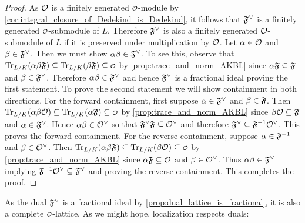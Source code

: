 \begin{proof}
      As $\mathcal{O}$ is a finitely generated $\smc{O}$-module by \cref{cor:integral_closure_of_Dedekind_is_Dedekind}, it follows that $\mathfrak{F}^{\vee}$ is a finitely generated $\smc{O}$-submodule of $L$. Therefore $\mathfrak{F}^{\vee}$ is also a finitely generated $\mathcal{O}$-submodule of $L$ if it is preserved under multiplication by $\mathcal{O}$. Let $\alpha \in \mathcal{O}$ and $\beta \in \mathfrak{F}^{\vee}$. Then we must show $\alpha\beta \in \mathfrak{F}^{\vee}$. To see this, observe that $\Trace_{L/K}(\a\b\mf{F}) \subseteq \Trace_{L/K}(\b\mf{F}) \subseteq \smc{O}$ by \cref{prop:trace_and_norm_AKBL} since $\alpha\mathfrak{F} \subseteq \mathfrak{F}$ and $\beta \in \mathfrak{F}^{\vee}$. Therefore $\alpha\beta \in \mathfrak{F}^{\vee}$ and hence $\mathfrak{F}^{\vee}$ is a fractional ideal proving the first statement. To prove the second statement we will show containment in both directions. For the forward containment, first suppose $\alpha \in \mathfrak{F}^{\vee}$ and $\beta \in \mathfrak{F}$. Then $\Trace_{L/K}(\a\b\mc{O}) \subseteq \Trace_{L/K}(\a\mf{F}) \subseteq \smc{O}$ by \cref{prop:trace_and_norm_AKBL} since $\beta\mathcal{O} \subseteq \mathfrak{F}$ and $\alpha \in \mathfrak{F}^{\vee}$. Hence $\alpha\beta \in \mathcal{O}^{\vee}$ so that $\mathfrak{F}^{\vee}\mathfrak{F} \subseteq \mathcal{O}^{\vee}$ and therefore $\mathfrak{F}^{\vee} \subseteq \mathfrak{F}^{-1}\mathcal{O}^{\vee}$. This proves the forward containment. For the reverse containment, suppose $\alpha \in \mathfrak{F}^{-1}$ and $\beta \in \mathcal{O}^{\vee}$. Then $\Trace_{L/K}(\a\b\mf{F}) \subseteq \Trace_{L/K}(\b\mc{O}) \subseteq \smc{O}$ by \cref{prop:trace_and_norm_AKBL} since $\alpha\mathfrak{F} \subseteq \mathcal{O}$ and $\beta \in \mathcal{O}^{\vee}$. Thus $\alpha\beta \in \mathfrak{F}^{\vee}$ implying $\mathfrak{F}^{-1}\mathcal{O}^{\vee} \subseteq \mathfrak{F}^{\vee}$ and proving the reverse containment. This completes the proof.
    \end{proof}

    As the dual $\mathfrak{F}^{\vee}$ is a fractional ideal by \cref{prop:dual_lattice_is_fractional}, it is also a complete $\smc{O}$-lattice. As we might hope, localization respects duals:

